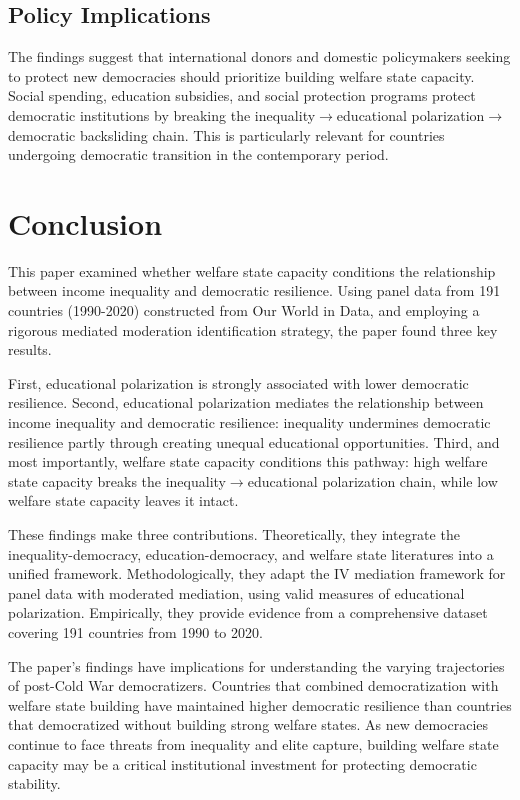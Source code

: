 \documentclass[11pt,letterpaper]{article}
\begin{document}
\subsection{Policy Implications}

The findings suggest that international donors and domestic policymakers seeking to protect new democracies should prioritize building welfare state capacity. Social spending, education subsidies, and social protection programs protect democratic institutions by breaking the inequality$\rightarrow$educational polarization$\rightarrow$democratic backsliding chain. This is particularly relevant for countries undergoing democratic transition in the contemporary period.

\section{Conclusion}

This paper examined whether welfare state capacity conditions the relationship between income inequality and democratic resilience. Using panel data from 191 countries (1990-2020) constructed from Our World in Data, and employing a rigorous mediated moderation identification strategy, the paper found three key results.

First, educational polarization is strongly associated with lower democratic resilience. Second, educational polarization mediates the relationship between income inequality and democratic resilience: inequality undermines democratic resilience partly through creating unequal educational opportunities. Third, and most importantly, welfare state capacity conditions this pathway: high welfare state capacity breaks the inequality$\rightarrow$educational polarization chain, while low welfare state capacity leaves it intact.

These findings make three contributions. Theoretically, they integrate the inequality-democracy, education-democracy, and welfare state literatures into a unified framework. Methodologically, they adapt the IV mediation framework for panel data with moderated mediation, using valid measures of educational polarization. Empirically, they provide evidence from a comprehensive dataset covering 191 countries from 1990 to 2020.

The paper's findings have implications for understanding the varying trajectories of post-Cold War democratizers. Countries that combined democratization with welfare state building have maintained higher democratic resilience than countries that democratized without building strong welfare states. As new democracies continue to face threats from inequality and elite capture, building welfare state capacity may be a critical institutional investment for protecting democratic stability.
\end{document}
